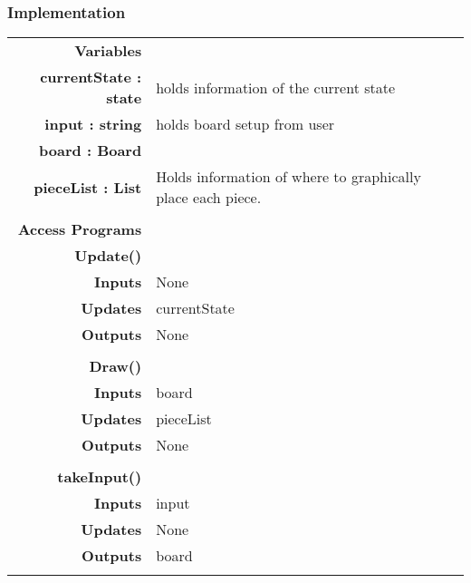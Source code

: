 \documentclass[10pt]{article}
\begin{document}
    \subsubsection{Implementation}
        \begin{tabularx}{\linewidth}{ >{\bfseries}r Xp{5cm} }
            Variables       & \begin{tabular}[t]{@{} l p{8cm}} 
                                     & \\
                                    currentState : state & holds information of the current state \\
                                    input : string & holds board setup from user \\ 
                                    board : Board & \\
                                    pieceList : List &  Holds information of where to graphically place each piece. \\
                                    
                              \end{tabular} \\

            Access Programs & \begin{tabular}[t]{@{} l l p{8cm}} 
                                     & \\
                                    \bf{Update()} & \\
                                    Inputs &  None \\
                                    Updates & currentState \\
                                    Outputs & None \\
                                     & \\
                                    \bf{Draw()} & \\
                                    Inputs & board \\
                                    Updates & pieceList \\
                                    Outputs & None \\
                                     & \\
                                    \bf{takeInput()} & \\
                                    Inputs & input \\
                                    Updates & None \\
                                    Outputs & board \\ 
                              \end{tabular} \\
                              
        \end{tabularx}
\end{document}
